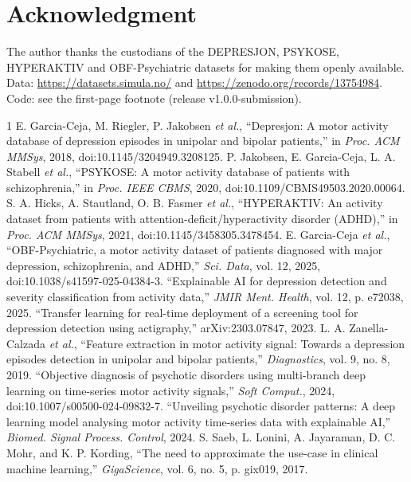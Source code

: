 \documentclass[journal]{IEEEtran}
\begin{document}
\section*{Acknowledgment}
The author thanks the custodians of the DEPRESJON, PSYKOSE, HYPERAKTIV and OBF-Psychiatric datasets for making them openly available. Data: \url{https://datasets.simula.no/} and \url{https://zenodo.org/records/13754984}. Code: see the first-page footnote (release v1.0.0-submission).

\begin{thebibliography}{1}
 E. Garcia-Ceja, M. Riegler, P. Jakobsen \emph{et al.}, ``Depresjon: A motor activity database of depression episodes in unipolar and bipolar patients,'' in \emph{Proc. ACM MMSys}, 2018, doi:10.1145/3204949.3208125.
 P. Jakobsen, E. Garcia-Ceja, L. A. Stabell \emph{et al.}, ``PSYKOSE: A motor activity database of patients with schizophrenia,'' in \emph{Proc. IEEE CBMS}, 2020, doi:10.1109/CBMS49503.2020.00064.
 S. A. Hicks, A. Stautland, O. B. Fasmer \emph{et al.}, ``HYPERAKTIV: An activity dataset from patients with attention-deficit/hyperactivity disorder (ADHD),'' in \emph{Proc. ACM MMSys}, 2021, doi:10.1145/3458305.3478454.
 E. Garcia-Ceja \emph{et al.}, ``OBF-Psychiatric, a motor activity dataset of patients diagnosed with major depression, schizophrenia, and ADHD,'' \emph{Sci. Data}, vol. 12, 2025, doi:10.1038/s41597-025-04384-3.
 ``Explainable AI for depression detection and severity classification from activity data,'' \emph{JMIR Ment. Health}, vol. 12, p. e72038, 2025.
 ``Transfer learning for real-time deployment of a screening tool for depression detection using actigraphy,'' arXiv:2303.07847, 2023.
 L. A. Zanella-Calzada \emph{et al.}, ``Feature extraction in motor activity signal: Towards a depression episodes detection in unipolar and bipolar patients,'' \emph{Diagnostics}, vol. 9, no. 8, 2019.
 ``Objective diagnosis of psychotic disorders using multi-branch deep learning on time-series motor activity signals,'' \emph{Soft Comput.}, 2024, doi:10.1007/s00500-024-09832-7.
 ``Unveiling psychotic disorder patterns: A deep learning model analysing motor activity time-series data with explainable AI,'' \emph{Biomed. Signal Process. Control}, 2024.
 S. Saeb, L. Lonini, A. Jayaraman, D. C. Mohr, and K. P. Kording, ``The need to approximate the use-case in clinical machine learning,'' \emph{GigaScience}, vol. 6, no. 5, p. gix019, 2017.

\end{thebibliography}
\end{document}

